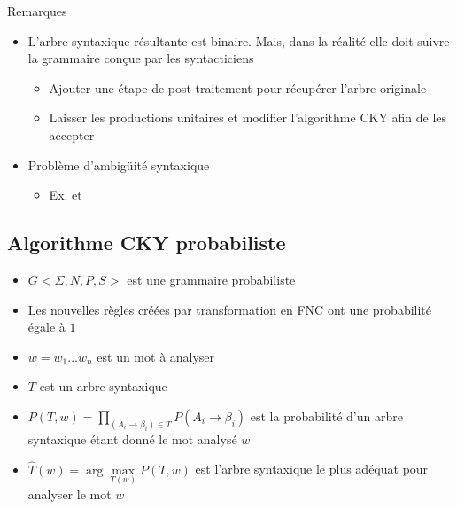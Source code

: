 \documentclass{KodeBook}
\begin{document}
Remarques
\begin{minipage}{.53\textwidth}
	\begin{itemize}
		\item L'arbre syntaxique résultante est binaire. Mais, dans la réalité elle doit suivre la grammaire conçue par les syntacticiens
		\begin{itemize}
			\item Ajouter une étape de post-traitement pour récupérer l'arbre originale
			\item Laisser les productions unitaires et modifier l'algorithme CKY afin de les accepter
		\end{itemize}
		\item Problème d'ambigüité syntaxique 
		\begin{itemize}
			\item Ex.  et 
		\end{itemize}
	\end{itemize}
\end{minipage}

\subsection{Algorithme CKY probabiliste}
\begin{itemize}
	\item $G<\Sigma, N, P, S>$ est une grammaire probabiliste
	\item Les nouvelles règles créées par transformation en FNC ont une probabilité égale à $1$
	\item $w = w_1 \ldots w_n$ est un mot à analyser 
	\item $T$ est un arbre syntaxique 
	\item $P(T, w) = \prod\limits_{(A_i \rightarrow \beta_i) \in T} P(A_i \rightarrow \beta_i)$ est la probabilité d'un arbre syntaxique étant donné le mot analysé $w$
	\item $\hat{T}(w) = \arg\max\limits_{T(w)} P(T, w) $ est l'arbre syntaxique le plus adéquat pour analyser le mot $w$
\end{itemize}
\end{document}
